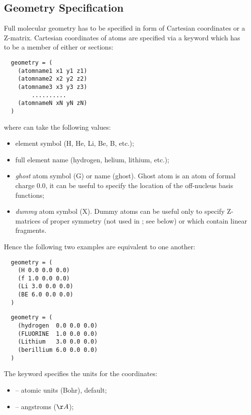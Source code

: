 \subsection{Geometry Specification}
Full molecular geometry has to be specified in form of Cartesian coordinates or
a Z-matrix. Cartesian coordinates of atoms are specified via a keyword
 which has to be a member of either 
or  sections:
\begin{verbatim}
  geometry = (
    (atomname1 x1 y1 z1)
    (atomname2 x2 y2 z2)
    (atomname3 x3 y3 z3)
        ..........
    (atomnameN xN yN zN)
  )
\end{verbatim}
where  can take the following values:
\begin{itemize}
\item element symbol (H, He, Li, Be, B, etc.);
\item full element name (hydrogen, helium, lithium, etc.);
\item {\em ghost} atom symbol (G) or name (ghost). Ghost atom is an atom
of formal charge 0.0, it can be useful to specify the location of
the off-nucleus basis functions;
\item {\em dummy} atom symbol (X). Dummy atoms can be useful only to specify
Z-matrices of proper symmetry (not used in \PSIthree; see below) or
which contain linear fragments.
\end{itemize}
Hence the following two examples are equivalent to one another:
\begin{verbatim}
  geometry = (
    (H 0.0 0.0 0.0)
    (f 1.0 0.0 0.0)
    (Li 3.0 0.0 0.0)
    (BE 6.0 0.0 0.0)
  )
\end{verbatim}
\begin{verbatim}
  geometry = (
    (hydrogen  0.0 0.0 0.0)
    (FLUORINE  1.0 0.0 0.0)
    (Lithium   3.0 0.0 0.0)
    (berillium 6.0 0.0 0.0)
  )
\end{verbatim}

The keyword  specifies the units for the coordinates:
\begin{itemize}
\item {} -- atomic units (Bohr), default;
\item {} -- angstroms ($\AA$);
\end{itemize}

